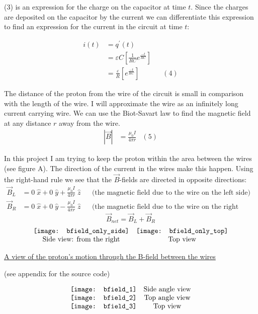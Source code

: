 \documentclass[11pt]{article}
\begin{document}
\vspace{.2in}
\noindent (3) is an expression for the charge on the capacitor at time $t$. Since the charges are deposited on the capacitor by the current we can differentiate this expression to find an expression for the current in the circuit at time $t$: 

\begin{align*}
i(t)&=q^{'}(t)\\&=\varepsilon C\left[\frac{1}{RC}e^{\frac{-t}{RC}}\right]\\&=\frac{\varepsilon}{R}\left[e^{\frac{-t}{RC}}\right]&&(4)
\end{align*}

\vspace{.2in}

\noindent The distance of the proton from the wire of the circuit is small in comparison with the length of the wire. I will approximate the wire as an infinitely long current carrying wire. We can use the Biot-Savart law to find the magnetic field at any distance $r$ away from the wire. 
\begin{align*}
\left|\vec{B}\right|&=\frac{\mu_0I}{4\pi r}&(5)
\end{align*}

\vspace{.2in}

\noindent In this project I am trying to keep the proton within the area between the wires (see figure A). The direction of the current in the wires make this happen. Using the right-hand rule we see that the $\vec{B}$-fields are directed in opposite directions:
\begin{align*}
\vec{B}_L&=0\;\hat{x}+0\;\hat{y}+\frac{\mu_0I}{4\pi r}\;\hat{z}&&\text{(the magnetic field due to the wire on the left side)}\\\vec{B}_R&=0\;\hat{x}+0\;\hat{y}-\frac{\mu_0I}{4\pi r}\;\hat{z}&&\text{(the magnetic field due to the wire on the right side)}
\end{align*}
\[
\vec{B}_{net}=\vec{B}_L+\vec{B}_R
\]
\[
\begin{array}{c c}
\texttt{[image: bfield\_only\_side]}	&	\texttt{[image: bfield\_only\_top]}\\
\text{Side view: from the right}								&	\text{Top view}
\end{array} 
\]


\newpage

\begin{center}
\underline{A view of the proton's motion through the B-field between the wires}

(see appendix for the source code)
\end{center}
\[
\begin{array}{c c}
\texttt{[image: bfield\_1]}	& 	\text{Side angle view}	\\
\texttt{[image: bfield\_2]}	& 	\text{Top angle view}	\\
\texttt{[image: bfield\_3]}	&	\text{Top view}			
\end{array}
\]
\end{document}
